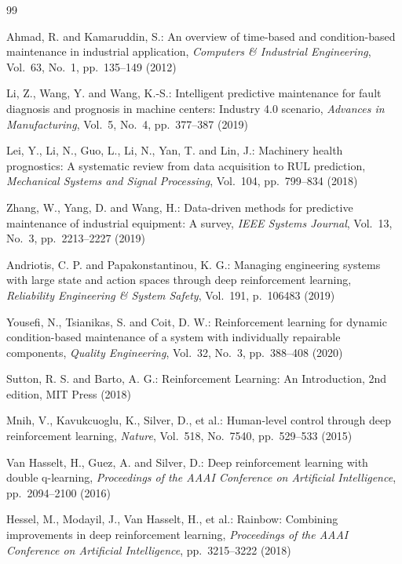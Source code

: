 \documentclass[twocolumn]{article}
\begin{document}

\begin{thebibliography}{99}

Ahmad, R. and Kamaruddin, S.:
An overview of time-based and condition-based maintenance in industrial application,
{\em Computers \& Industrial Engineering}, Vol.~63, No.~1, pp.~135--149 (2012)

Li, Z., Wang, Y. and Wang, K.-S.:
Intelligent predictive maintenance for fault diagnosis and prognosis in machine centers: Industry 4.0 scenario,
{\em Advances in Manufacturing}, Vol.~5, No.~4, pp.~377--387 (2019)

Lei, Y., Li, N., Guo, L., Li, N., Yan, T. and Lin, J.:
Machinery health prognostics: A systematic review from data acquisition to RUL prediction,
{\em Mechanical Systems and Signal Processing}, Vol.~104, pp.~799--834 (2018)

Zhang, W., Yang, D. and Wang, H.:
Data-driven methods for predictive maintenance of industrial equipment: A survey,
{\em IEEE Systems Journal}, Vol.~13, No.~3, pp.~2213--2227 (2019)

Andriotis, C. P. and Papakonstantinou, K. G.:
Managing engineering systems with large state and action spaces through deep reinforcement learning,
{\em Reliability Engineering \& System Safety}, Vol.~191, p.~106483 (2019)

Yousefi, N., Tsianikas, S. and Coit, D. W.:
Reinforcement learning for dynamic condition-based maintenance of a system with individually repairable components,
{\em Quality Engineering}, Vol.~32, No.~3, pp.~388--408 (2020)

Sutton, R. S. and Barto, A. G.:
Reinforcement Learning: An Introduction, 2nd edition,
MIT Press (2018)

Mnih, V., Kavukcuoglu, K., Silver, D., et al.:
Human-level control through deep reinforcement learning,
{\em Nature}, Vol.~518, No.~7540, pp.~529--533 (2015)

Van Hasselt, H., Guez, A. and Silver, D.:
Deep reinforcement learning with double q-learning,
{\em Proceedings of the AAAI Conference on Artificial Intelligence}, pp.~2094--2100 (2016)

Hessel, M., Modayil, J., Van Hasselt, H., et al.:
Rainbow: Combining improvements in deep reinforcement learning,
{\em Proceedings of the AAAI Conference on Artificial Intelligence}, pp.~3215--3222 (2018)


\end{thebibliography}
\end{document}
